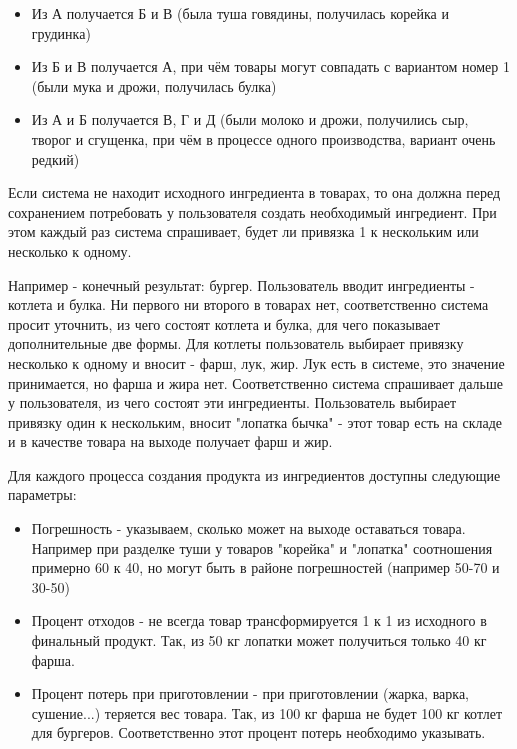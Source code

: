 \documentclass[DIV=calc, paper=a4, fontsize=11pt]{scrartcl} %
\begin{document}
\begin{itemize}
	\item Из А получается Б и В (была туша говядины, получилась корейка и грудинка)
	\item Из Б и В получается А, при чём товары могут совпадать с вариантом номер 1 (были мука и дрожи, получилась булка)
	\item Из А и Б получается В, Г и Д (были молоко и дрожи, получились сыр, творог и сгущенка, при чём в процессе одного производства, вариант очень редкий)
\end{itemize}

Если система не находит исходного ингредиента в товарах, то она должна перед сохранением потребовать у пользователя создать необходимый ингредиент. При этом каждый раз система спрашивает, будет ли привязка 1 к нескольким или несколько к одному.

\begin{framed}
	Например - конечный результат: бургер. Пользователь вводит ингредиенты - котлета и булка. Ни первого ни второго в товарах нет, соответственно система просит уточнить, из чего состоят котлета и булка, для чего показывает дополнительные две формы. Для котлеты пользователь выбирает привязку несколько к одному и вносит - фарш, лук, жир. Лук есть в системе, это значение принимается, но фарша и жира нет. Соответственно система спрашивает дальше у пользователя, из чего состоят эти ингредиенты. Пользователь выбирает привязку один к нескольким, вносит "лопатка бычка" - этот товар есть на складе и в качестве товара на выходе получает фарш и жир.
\end{framed}

Для каждого процесса создания продукта из ингредиентов доступны следующие параметры:

\begin{itemize}
	\item Погрешность - указываем, сколько может на выходе оставаться товара. Например при разделке туши у товаров "корейка" и "лопатка" соотношения примерно 60 к 40, но могут быть в районе погрешностей (например 50-70 и 30-50)
	\item Процент отходов - не всегда товар трансформируется 1 к 1 из исходного в финальный продукт. Так, из 50 кг лопатки может получиться только 40 кг фарша.
	\item Процент потерь при приготовлении - при приготовлении (жарка, варка, сушение...) теряется вес товара. Так, из 100 кг фарша не будет 100 кг котлет для бургеров. Соответственно этот процент потерь необходимо указывать. 
\end{itemize}
\end{document}
